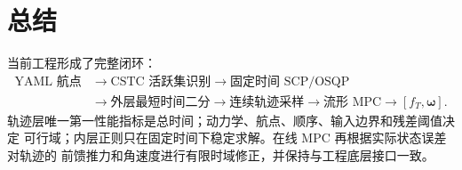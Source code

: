 \documentclass[UTF8,a4paper,11pt]{ctexart}
\begin{document}
\section{总结}

当前工程形成了完整闭环：
\[
\begin{aligned}
\text{YAML 航点}
&\rightarrow\text{CSTC 活跃集识别}
\rightarrow\text{固定时间 SCP/OSQP}\\
&\rightarrow\text{外层最短时间二分}
\rightarrow\text{连续轨迹采样}
\rightarrow\text{流形 MPC}
\rightarrow[f_T,\bm\omega].
\end{aligned}
\]
轨迹层唯一第一性能指标是总时间；动力学、航点、顺序、输入边界和残差阈值决定
可行域；内层正则只在固定时间下稳定求解。在线 MPC 再根据实际状态误差对轨迹的
前馈推力和角速度进行有限时域修正，并保持与工程底层接口一致。
\end{document}
